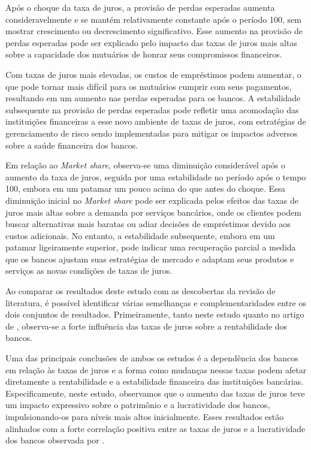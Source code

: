 \documentclass[hidelinks, article,12pt,oneside,a4paper,english,brazil,sumario=tradicional]{abntex2}
\begin{document}
Após o choque da taxa de juros, a provisão de perdas esperadas aumenta consideravelmente e se mantém relativamente constante após o período 100, sem mostrar crescimento ou decrescimento significativo. Esse aumento na provisão de perdas esperadas pode ser explicado pelo impacto das taxas de juros mais altas sobre a capacidade dos mutuários de honrar seus compromissos financeiros. 

Com taxas de juros mais elevadas, os custos de empréstimos podem aumentar, o que pode tornar mais difícil para os mutuários cumprir com seus pagamentos, resultando em um aumento nas perdas esperadas para os bancos. A estabilidade subsequente na provisão de perdas esperadas pode refletir uma acomodação das instituições financeiras a esse novo ambiente de taxas de juros, com estratégias de gerenciamento de risco sendo implementadas para mitigar os impactos adversos sobre a saúde financeira dos bancos.

Em relação ao \textit{Market share}, observa-se uma diminuição considerável após o aumento da taxa de juros, seguida por uma estabilidade no período após o tempo 100, embora em um patamar um pouco acima do que antes do choque. Essa diminuição inicial no \textit{Market share} pode ser explicada pelos efeitos das taxas de juros mais altas sobre a demanda por serviços bancários, onde os clientes podem buscar alternativas mais baratas ou adiar decisões de empréstimos devido aos custos adicionais. No entanto, a estabilidade subsequente, embora em um patamar ligeiramente superior, pode indicar uma recuperação parcial a medida que os bancos ajustam suas estratégias de mercado e adaptam seus produtos e serviços as novas condições de taxas de juros. 

Ao comparar os resultados deste estudo com as descobertas da revisão de literatura, é possível identificar várias semelhanças e complementaridades entre os dois conjuntos de resultados. Primeiramente, tanto neste estudo quanto no artigo de , observa-se a forte influência das taxas de juros sobre a rentabilidade dos bancos.

Uma das principais conclusões de ambos os estudos é a dependência dos bancos em relação às taxas de juros e a forma como mudanças nessas taxas podem afetar diretamente a rentabilidade e a estabilidade financeira das instituições bancárias. Especificamente, neste estudo, observamos que o aumento das taxas de juros teve um impacto expressivo sobre o patrimônio e a lucratividade dos bancos, impulsionando-os para níveis mais altos inicialmente. Esses resultados estão alinhados com a forte correlação positiva entre as taxas de juros e a lucratividade dos bancos observada por .
\end{document}
